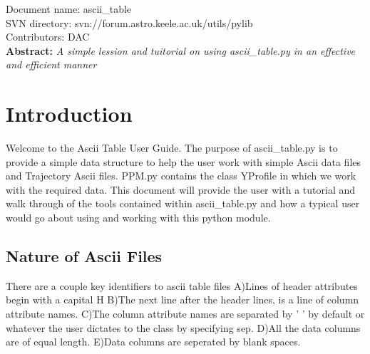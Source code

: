 \renewcommand{\ndoctitle}{ascii\_table.py: Simple Ascii Table Data Structure} 
\renewcommand{\ndocname}{ascii\_table}                      
\renewcommand{\svndir}{svn://forum.astro.keele.ac.uk/utils/pylib}  
\renewcommand{\ndoccontribs}{DAC}



Document name: \ndocname \\
SVN directory: \svndir\\
Contributors: \ndoccontribs\\



{  \textbf{Abstract:} \slshape
A simple lession and tuitorial on using ascii\_table.py in an effective and efficient manner
}
%

\section{Introduction}
Welcome to the Ascii Table User Guide.  The purpose of ascii\_table.py is
to provide a simple data structure to help the user work with simple Ascii data files
and Trajectory Ascii files. 
PPM.py contains the class YProfile in which we work with the required data.
This document will provide the user with a 
tutorial and walk through of the tools contained within ascii\_table.py and
how a typical user would go about using and working with this python module.
\subsection{Nature of Ascii Files}
There are a couple key identifiers to ascii table files \newline
A)Lines of header attributes begin with a capital H \newline
B)The next line after the header lines, is a line of column attribute names.\newline
C)The column attribute names are separated by '  ' by default or whatever the 
user dictates to the class by specifying sep.\newline
D)All the data columns are of equal length.\newline
E)Data columns are seperated by blank spaces.\newline
